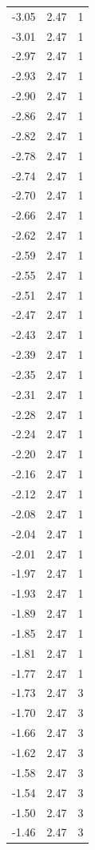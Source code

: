 \begin{longtable}{lrr}
  -3.05 & 2.47 & 1 \\
  -3.01 & 2.47 & 1 \\
  -2.97 & 2.47 & 1 \\
  -2.93 & 2.47 & 1 \\
  -2.90 & 2.47 & 1 \\
  -2.86 & 2.47 & 1 \\
  -2.82 & 2.47 & 1 \\
  -2.78 & 2.47 & 1 \\
  -2.74 & 2.47 & 1 \\
  -2.70 & 2.47 & 1 \\
  -2.66 & 2.47 & 1 \\
  -2.62 & 2.47 & 1 \\
  -2.59 & 2.47 & 1 \\
  -2.55 & 2.47 & 1 \\
  -2.51 & 2.47 & 1 \\
  -2.47 & 2.47 & 1 \\
  -2.43 & 2.47 & 1 \\
  -2.39 & 2.47 & 1 \\
  -2.35 & 2.47 & 1 \\
  -2.31 & 2.47 & 1 \\
  -2.28 & 2.47 & 1 \\
  -2.24 & 2.47 & 1 \\
  -2.20 & 2.47 & 1 \\
  -2.16 & 2.47 & 1 \\
  -2.12 & 2.47 & 1 \\
  -2.08 & 2.47 & 1 \\
  -2.04 & 2.47 & 1 \\
  -2.01 & 2.47 & 1 \\
  -1.97 & 2.47 & 1 \\
  -1.93 & 2.47 & 1 \\
  -1.89 & 2.47 & 1 \\
  -1.85 & 2.47 & 1 \\
  -1.81 & 2.47 & 1 \\
  -1.77 & 2.47 & 1 \\
  -1.73 & 2.47 & 3 \\
  -1.70 & 2.47 & 3 \\
  -1.66 & 2.47 & 3 \\
  -1.62 & 2.47 & 3 \\
  -1.58 & 2.47 & 3 \\
  -1.54 & 2.47 & 3 \\
  -1.50 & 2.47 & 3 \\
  -1.46 & 2.47 & 3 \\

\end{longtable}
